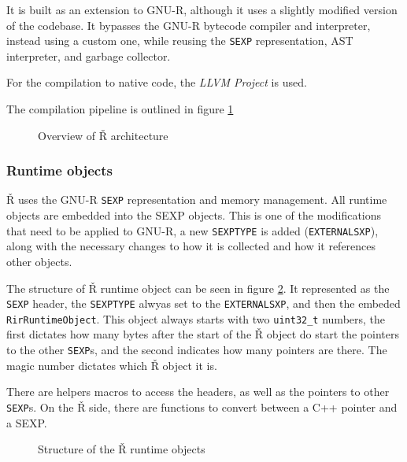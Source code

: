 It is built as an extension to GNU-R, although it uses a slightly modified version of the codebase. It bypasses the GNU-R bytecode compiler and interpreter, instead using a custom one, while reusing the \texttt{SEXP} representation, AST interpreter, and garbage collector.

For the compilation to native code, the \textit{LLVM Project}\cite{llvm} is used.

The compilation pipeline is outlined in figure \ref{fig:rsh-archit}

\begin{figure}
	\centering
	\caption{Overview of Ř architecture\cite{reusing-jit}}\label{fig:rsh-archit}
\end{figure}

\subsubsection*{Runtime objects}

Ř uses the GNU-R \texttt{SEXP} representation and memory management. All runtime objects are embedded into the SEXP objects. This is one of the modifications that need to be applied to GNU-R, a new \texttt{SEXPTYPE} is added (\texttt{EXTERNALSXP}), along with the necessary changes to how it is collected and how it references other objects.

The structure of Ř runtime object can be seen in figure \ref{fig:rsh-object-struct}. It represented as the \texttt{SEXP} header, the \texttt{SEXPTYPE} alwyas set to the \texttt{EXTERNALSXP}, and then the embeded \texttt{RirRuntimeObject}. This object always starts with two \texttt{uint32\_t} numbers, the first dictates how many bytes after the start of the Ř object do start the pointers to the other \texttt{SEXP}s, and the second indicates how many pointers are there. The magic number dictates which Ř object it is.

There are helpers macros to access the headers, as well as the pointers to other \texttt{SEXP}s. On the Ř side, there are functions to convert between a C++ pointer and a SEXP.

\begin{figure}
	\centering
	\begin{adjustbox}{trim=10 80pt 0 0, clip}
	\end{adjustbox}
	\caption{Structure of the Ř runtime objects}\label{fig:rsh-object-struct}
\end{figure}

